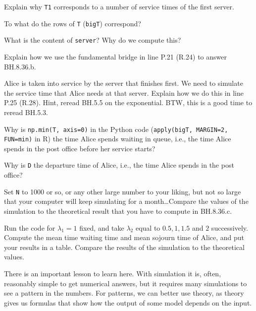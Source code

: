 \begin{exercise}
Explain why  \texttt{T1} corresponds to a number of service times of the first server.
\end{exercise}

\begin{exercise}
To what do the rows of \texttt{T} (\texttt{bigT}) correspond?
\end{exercise}

\begin{exercise}
What is the content of \texttt{server}? Why do we compute this?
\end{exercise}

\begin{exercise}
Explain how we use the fundamental bridge in line P.21 (R.24) to answer BH.8.36.b.
\end{exercise}


\begin{exercise}
Alice is taken into service by the server that finishes first.
We need to simulate the service time that Alice needs at that server.
Explain how we do this in line P.25 (R.28). Hint, reread BH.5.5 on the exponential. BTW, this is a good time to reread BH.5.3.
\end{exercise}

\begin{exercise}
Why is \texttt{np.min(T, axis=0)} in the Python code (\texttt{apply(bigT, MARGIN=2, FUN=min)} in  R) the time Alice spends waiting in queue, i.e., the time Alice spends in the post office before her service starts?
\end{exercise}


\begin{exercise}
Why is \texttt{D} the departure time of Alice, i.e., the time Alice spends in the post office?
\end{exercise}


\begin{exercise}
Set \texttt{N} to 1000 or so, or any other large number to your liking, but not so large that your computer will keep simulating for a month\ldots Compare the values of the simulation to the theoretical result that you have to compute in BH.8.36.c.
\end{exercise}


\begin{exercise}
Run the code for $\lambda_{1}=1$ fixed, and take $\lambda_{2}$ equal to $0.5, 1, 1.5$ and $2$ successively. Compute the mean time waiting time and mean sojourn time of Alice, and put your results in a table. Compare the results of the simulation to the theoretical values.
\end{exercise}

There is an important lesson to learn here.
With simulation it is, often, reasonably simple to get numerical answers, but it requires many simulations to see a pattern in the numbers.
For patterns, we can better use theory, as theory gives us formulas that show how the output of some model depends on the input.
